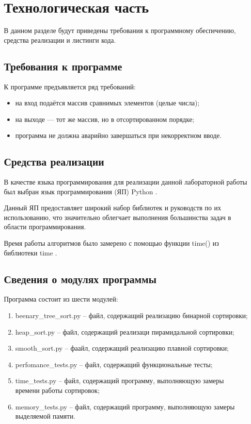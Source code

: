 \chapter{Технологическая часть}

В данном разделе будут приведены требования к программному обеспечению, средства реализации и листинги кода.

\section{Требования к программе}

К программе предъявляется ряд требований:
\begin{itemize}
	\item на вход подаётся массив сравнимых элементов (целые числа);
	\item на выходе — тот же массив, но в отсортированном порядке;
	\item программа не должна аварийно завершаться при некорректном вводе.
\end{itemize}

\section{Средства реализации}

В качестве языка программирования для реализации данной лабораторной работы был выбран язык программирования (ЯП) Python \cite{pythonlang}. 

Данный ЯП предоставляет широкий набор библиотек и руководств по их использованию, что значительно облегчает выполнения большинства задач в области программирования. 

Время работы алгоритмов было замерено с помощью функции time() из библиотеки time \cite{pythonlangtime}.

\section{Сведения о модулях программы}
Программа состоит из шести модулей:
\begin{enumerate}
	\item beenary\_tree\_sort.py -- файл, содержащий реализацию бинарной сортировки;
	\item heap\_sort.py -- файл, содержащий реализаци пирамидальной сортировки;
	\item smooth\_sort.py -- фаайл, содержащий реализацию плавной сортировки;
	\item perfomance\_tests.py -- файл, содержащий функциональные тесты;
	\item time\_tests.py -- файл, содержащий программу, выполняющую замеры времени работы сортировок;
	\item memory\_tests.py -- файл, содержащий программу, выполняющую замеры выделяемой памяти.
\end{enumerate}


